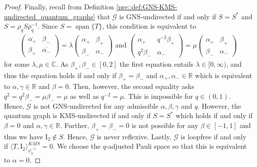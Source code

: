 \documentclass{amsart}
\newcommand{\R}{\mathbb{R}}
\newcommand{\C}{\mathbb{C}}
\DeclareMathOperator{\spann}{span}
\begin{document}
\begin{proof}
    Finally, recall from Definition \ref{pre::def:GNS-KMS-undirected_quantum_graphs} that $\mathcal{G}$ is GNS-undirected if and only if $S = S^*$ and $S = \rho_q S \rho_q^{-1}$. 
    Since $S = \spann\{T\}$, this condition is equivalent to 
    \begin{align*}
        \begin{pmatrix}
            \overline{\alpha_+} & \beta_- \\
            \beta_+  & \overline{\alpha_-}
        \end{pmatrix}
        = \lambda \begin{pmatrix}
            \alpha_+ & \beta_+ \\
            \beta_-  & \alpha_-
        \end{pmatrix}
        \text{ and }
        \begin{pmatrix}
            \alpha_+ & q^{-2} \beta_+ \\
            q^{2} \beta_-  & \alpha_-
        \end{pmatrix}
        = \mu \begin{pmatrix}
            \alpha_+ & \beta_+ \\
            \beta_-  & \alpha_-
        \end{pmatrix}
    \end{align*}
    for some $\lambda, \mu \in \C$. As $\beta_+, \beta_- \in [0,2]$ the first equation entails $\lambda\in [0, \infty)$, and thus the equation holds if and only if $\beta_+ = \beta_-$ and $\alpha_+, \alpha_- \in \R$ which is equivalent to $\alpha, \gamma \in \R$ and $\beta = 0$. Then, however, the second equality asks $q^2 = q^2 \beta_- = \mu \beta_- = \mu$ as well as $q^{-2} = \mu$. This is impossible for $q \in (0,1)$. Hence, $\mathcal{G}$ is not GNS-undirected for any admissible $\alpha, \beta, \gamma$ and $q$.
    However, the quantum graph is KMS-undirected if and only if $S = S^*$ which holds if and only if $\beta = 0$ and $\alpha, \gamma \in \R$. 
    Further, $\beta_+=\beta_-=0$ is not possible for any $\beta\in[-1,1]$ and thus we have $\mathrm{I}_2\notin S$. Hence, $\mathcal{G}$ is never reflexive.
    Lastly, $\mathcal{G}$ is loopfree if and only if $\langle T, \mathrm{I}_2 \rangle_{\psi_q^{-1}}^{KMS} = 0$. We choose the $q$-adjusted Pauli space so that this is equivalent to $\alpha = 0$.
\end{proof}
\end{document}
